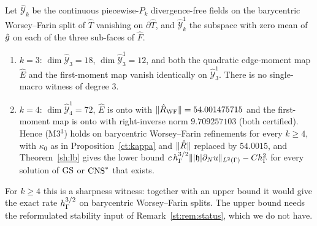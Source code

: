 \begin{proposition}\label{sh:wf}
Let $\hat{\mathcal Y}_k$ be the continuous piecewise-$P_k$ divergence-free fields on the barycentric Worsey--Farin split of $\hat T$ vanishing on $\partial\hat T$, and $\hat{\mathcal Y}^1_k$ the subspace with zero mean of $\hat g$ on each of the three sub-faces of $\hat F$.
\begin{enumerate}[label=(\roman*)]
\item $k=3$: $\dim\hat{\mathcal Y}_3=18$, $\dim\hat{\mathcal Y}^1_3=12$, and both the quadratic edge-moment map $\hat E$ and the first-moment map vanish identically on $\hat{\mathcal Y}^1_3$. There is no single-macro witness of degree $3$.
\item $k=4$: $\dim\hat{\mathcal Y}^1_4=72$, $\hat E$ is onto with $\lVert \hat R_{\rm WF}\rVert=54.001475715$ and the first-moment map is onto with right-inverse norm $9.709257103$ (both certified). Hence (M3$^3$) holds on barycentric Worsey--Farin refinements for every $k\ge4$, with $\kappa_0$ as in Proposition~\ref{ct:kappa} and $\lVert \hat R\rVert$ replaced by $54.0015$, and Theorem~\ref{sh:lb} gives the lower bound $c\,h_\Gamma^{3/2}\lVert |\mathfrak h|\partial_Nu\rVert_{L^2(\Gamma)}-Ch_\Gamma^2$ for every solution of $\mathrm{GS}$ or $\mathrm{CNS}^\ast$ that exists.
\end{enumerate}
\end{proposition}
For $k\ge4$ this is a sharpness witness: together with an upper bound it would give the exact rate $h_\Gamma^{3/2}$ on barycentric Worsey--Farin splits. The upper bound needs the reformulated stability input of Remark~\ref{st:rem:status}, which we do not have.
